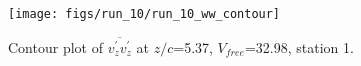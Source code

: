 \begin{figure}[H]
\centering
\texttt{[image: figs/run\_10/run\_10\_ww\_contour]}
\caption{Contour plot of $\overline{v_{z}^{\prime} v_{z}^{\prime}}$ at $z/c$=5.37, $V_{free}$=32.98, station 1.}
\label{fig:run_10_ww_contour}
\end{figure}


